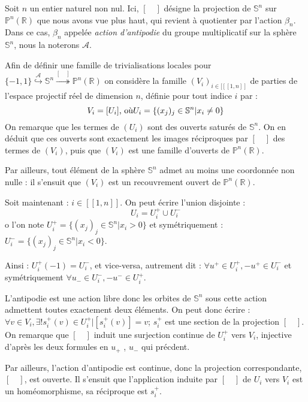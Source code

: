 \begin{exem}
Soit $n$ un entier naturel non nul. Ici, $[\quad]$ d\'esigne la projection de $\mathbb{S}^n$ sur $\mathbb{P}^n(\mathbb{R})$ que nous avons vue plus haut, %
qui revient \`a quotienter par l'action $\beta_n$. %
Dans ce cas, $\beta_n$ appelée \textit{action d'antipodie} du groupe multiplicatif sur la sph\`ere $\mathbb{S}^n$, nous la noterons $\mathcal{A}$.

\medskip
Afin de d\'efinir une famille de trivialisations locales pour %
$\{-1,1\} \overset{\mathcal{A}}{\hookrightarrow} \mathbb{S}^n \overset{[\quad ]}{\twoheadrightarrow} \mathbb{P}^n(\mathbb{R})$ %
on considère la famille $(V_i)_{i \in [\![[1,n]\!]}$ de parties de l'espace projectif réel de dimension $n$, définie pour tout indice $i$ par :
\[V_i = [U_i] \text{, o\`u} U_i = \{(x_j)_j \in \mathbb{S}^n | x_i \neq 0\}\]
On remarque que les termes de $(U_i)$ sont des ouverts satur\'es de $\mathbb{S}^n$. %
On en d\'eduit que ces ouverts sont exactement les images r\'eciproques par $[\quad]$ des termes de $(V_i)$, %
puis que $(V_i)$ est une famille d'ouverts de $\mathbb{P}^n(\mathbb{R})$.

\par
Par ailleurs, tout \'el\'ement de la sph\`ere $\mathbb{S}^n$ admet au moins une coordonn\'ee non nulle : %
il s'ensuit que $(V_i)$ est un recouvrement ouvert de $\mathbb{P}^n(\mathbb{R})$.

\medskip
Soit maintenant : $i \in [\![1,n]\!]$. On peut \'ecrire l'union disjointe :
\[U_i = U_i^+ \cup U_i^-\]
o l'on note $U_i^+ = \{ (x_j)_j \in \mathbb{S}^n | x_i > 0 \}$ et sym\'etriquement : $U_i^- = \{ (x_j)_j \in \mathbb{S}^n | x_i < 0 \}$.

\par
Ainsi : $U_i^+(-1) = U_i^-$, et vice-versa, autrement dit : $\forall u^+ \in U_i^+ , -u^+ \in U_i^-$ et sym\'etriquement $\forall u_- \in U_i^- , -u^- \in U_i^+$.

\par
L'antipodie est une action libre donc les orbites de $\mathbb{S}^n$ sous cette action admettent toutes exactement deux \'el\'ements. %
On peut donc écrire : $\forall v \in V_i , \exists ! s_i^+(v) \in U_i^+ | [s_i^+(v)] = v$; $s_i^+$ est une section de la projection $[\quad]$. %
On remarque que $[\quad]$ induit une surjection continue de $U_i^+$ vers $V_i$, injective d'après les deux formules en $u_+$ , $u_-$ qui pr\'ecdent.

\par
Par ailleurs, l'action d'antipodie est continue, donc la projection correspondante, $[\quad]$, est ouverte. %
Il s'ensuit que l'application induite par $[\quad]$ de $U_i$ vers $V_i$ est un homéomorphisme, sa réciproque est $s_i^+$.


\end{exem}
